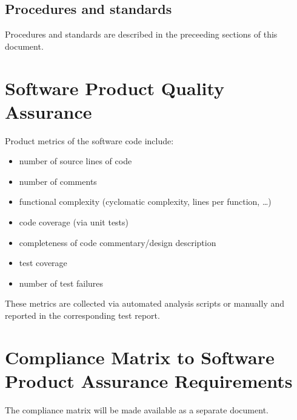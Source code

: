 \section{Procedures and standards}

Procedures and standards are described in the preceeding sections of this
document.




\chapter{Software Product Quality Assurance}


Product metrics of the software code include:

\begin{itemize}
	\item number of source lines of code
	\item number of comments
	\item functional complexity (cyclomatic complexity, lines per function, \ldots)
	\item code coverage (via unit tests)
	\item completeness of code commentary/design description
	\item test coverage
	\item number of test failures
\end{itemize}

\noindent
These metrics are collected via automated analysis scripts or manually and
reported in the corresponding test report.



\chapter{Compliance Matrix to Software Product Assurance Requirements}

The compliance matrix will be made available as a separate document.






